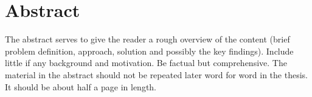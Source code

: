 \chapter*{Abstract} 

The abstract serves to give the reader a rough overview of the content (brief problem
definition, approach, solution and possibly the key findings). Include little if any
background and motivation. Be factual but comprehensive. The material in the abstract
should not be repeated later word for word in the thesis. It should be about half a page
in length. 
